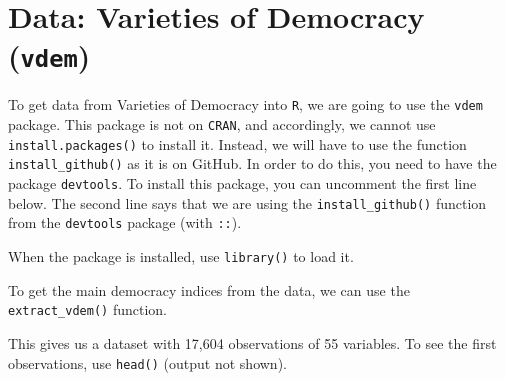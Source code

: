 \documentclass[12pt,oneside]{reedthesis}
\theoremstyle{definition}
\theoremstyle{definition}
\theoremstyle{definition}
\theoremstyle{remark}
\begin{document}
  \section{\texorpdfstring{Data: Varieties of Democracy
  (\texttt{vdem})}{Data: Varieties of Democracy (vdem)}}\label{data-varieties-of-democracy-vdem}
  
  To get data from Varieties of Democracy into \texttt{R}, we are going to
  use the \texttt{vdem} package. This package is not on \texttt{CRAN}, and
  accordingly, we cannot use \texttt{install.packages()} to install it.
  Instead, we will have to use the function \texttt{install\_github()} as
  it is on GitHub. In order to do this, you need to have the package
  \texttt{devtools}. To install this package, you can uncomment the first
  line below. The second line says that we are using the
  \texttt{install\_github()} function from the \texttt{devtools} package
  (with \texttt{::}).
  \begin{Shaded}
  \begin{Highlighting}[]
  \OperatorTok{::}\NormalTok{(}\NormalTok{)}
  \end{Highlighting}
  \end{Shaded}
  When the package is installed, use \texttt{library()} to load it.
  \begin{Shaded}
  \begin{Highlighting}[]
  \NormalTok{(}\NormalTok{)}
  \end{Highlighting}
  \end{Shaded}
  To get the main democracy indices from the data, we can use the
  \texttt{extract\_vdem()} function.
  \begin{Shaded}
  \begin{Highlighting}[]
  \StringTok{ }\NormalTok{(} \NormalTok{)}
  \end{Highlighting}
  \end{Shaded}
  This gives us a dataset with 17,604 observations of 55 variables. To see
  the first observations, use \texttt{head()} (output not shown).
  \begin{Shaded}
  \begin{Highlighting}[]
  \end{Highlighting}
  \end{Shaded}
\end{document}
